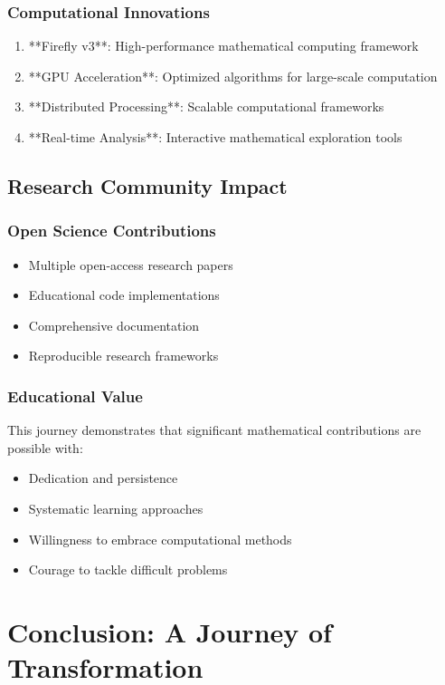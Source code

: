 \documentclass[12pt]{article}
\begin{document}
\subsubsection{Computational Innovations}
\begin{enumerate}
    \item **Firefly v3**: High-performance mathematical computing framework
    \item **GPU Acceleration**: Optimized algorithms for large-scale computation
    \item **Distributed Processing**: Scalable computational frameworks
    \item **Real-time Analysis**: Interactive mathematical exploration tools
\end{enumerate}

\subsection{Research Community Impact}

\subsubsection{Open Science Contributions}
\begin{itemize}
    \item Multiple open-access research papers
    \item Educational code implementations
    \item Comprehensive documentation
    \item Reproducible research frameworks
\end{itemize}

\subsubsection{Educational Value}

This journey demonstrates that significant mathematical contributions are possible with:
\begin{itemize}
    \item Dedication and persistence
    \item Systematic learning approaches
    \item Willingness to embrace computational methods
    \item Courage to tackle difficult problems
\end{itemize}

\section{Conclusion: A Journey of Transformation}
\end{document}
